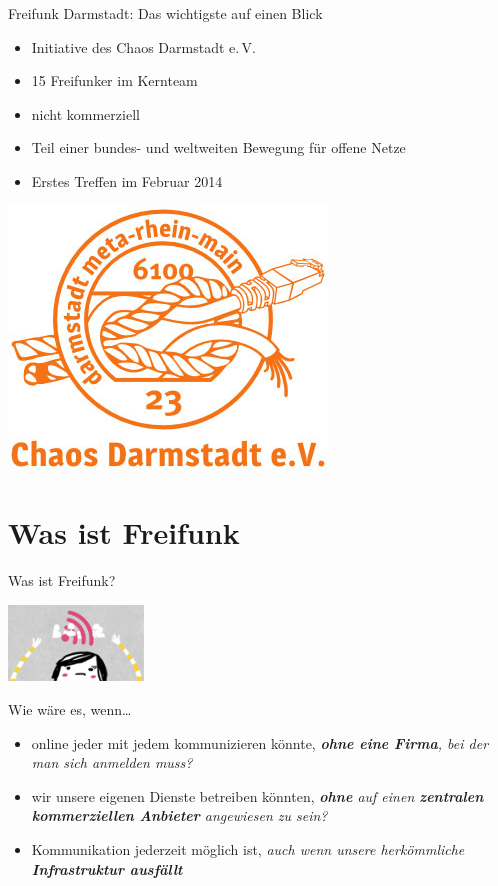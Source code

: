 \documentclass[10pt]{beamer}
\begin{document}
  \begin{frame}{Freifunk Darmstadt: Das wichtigste auf einen Blick}
    \begin{center}
    \begin{itemize}
	  \item Initiative des Chaos Darmstadt e.\,V.
      \item 15 Freifunker im Kernteam
	  \item nicht kommerziell
	  \item Teil einer bundes- und weltweiten Bewegung für offene Netze
	  \item Erstes Treffen im Februar 2014
    \end{itemize}
    \vfill
    \includegraphics[width=.3\textheight]{images/cda}
    \end{center}
  \end{frame}


  \section{Was ist Freifunk}

  \begin{frame}{Was ist Freifunk?}
      \begin{center}
        \includegraphics[width=3.6cm]{images/up}
      \end{center}
      Wie wäre es, wenn\ldots
      \begin{itemize}
        \pause
        \item online jeder mit jedem kommunizieren könnte\pause, \textit{\textbf{ohne eine Firma}, bei der man sich anmelden muss?}
        \pause
        \item wir unsere eigenen Dienste betreiben könnten\pause,  \textit{\textbf{ohne} auf einen \textbf{zentralen kommerziellen Anbieter} angewiesen zu sein?}
        \pause
        \item Kommunikation jederzeit möglich ist\pause, \textit{auch wenn unsere herkömmliche \textbf{Infrastruktur ausfällt}}
      \end{itemize}
    \end{frame}
\end{document}
